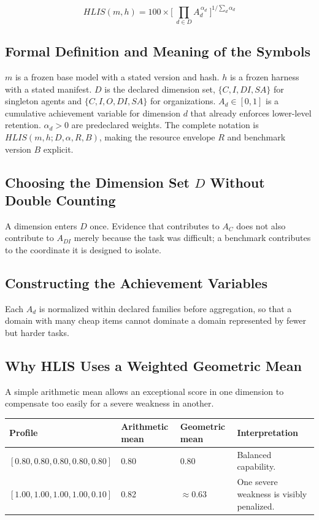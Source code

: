 \documentclass[11pt]{article}
\theoremstyle{definition}
\begin{document}
\begin{equation}
HLIS(m,h) = 100 \times \Big[\ \prod_{d \in D} A_d^{\,\alpha_d}\ \Big]^{1/\sum_d \alpha_d}
\end{equation}

\subsection{Formal Definition and Meaning of the Symbols}

$m$ is a frozen base model with a stated version and hash. $h$ is a frozen harness with a stated manifest. $D$ is the declared dimension set, $\{C,I,DI,SA\}$ for singleton agents and $\{C,I,O,DI,SA\}$ for organizations. $A_d \in [0,1]$ is a cumulative achievement variable for dimension $d$ that already enforces lower-level retention. $\alpha_d > 0$ are predeclared weights. The complete notation is $HLIS(m,h;D,\alpha,R,B)$, making the resource envelope $R$ and benchmark version $B$ explicit.

\subsection{Choosing the Dimension Set \texorpdfstring{$D$}{D} Without Double Counting}

A dimension enters $D$ once. Evidence that contributes to $A_C$ does not also contribute to $A_{DI}$ merely because the task was difficult; a benchmark contributes to the coordinate it is designed to isolate.

\subsection{Constructing the Achievement Variables}

Each $A_d$ is normalized within declared families before aggregation, so that a domain with many cheap items cannot dominate a domain represented by fewer but harder tasks.

\subsection{Why HLIS Uses a Weighted Geometric Mean}

A simple arithmetic mean allows an exceptional score in one dimension to compensate too easily for a severe weakness in another.

\begin{table}[h]
\centering\small
\begin{tabularx}{\textwidth}{@{}lllY@{}}
\toprule
Profile & Arithmetic mean & Geometric mean & Interpretation \\
\midrule
$[0.80,0.80,0.80,0.80,0.80]$ & 0.80 & 0.80 & Balanced capability. \\
$[1.00,1.00,1.00,1.00,0.10]$ & 0.82 & $\approx$0.63 & One severe weakness is visibly penalized. \\
\bottomrule
\end{tabularx}
\end{table}
\end{document}
